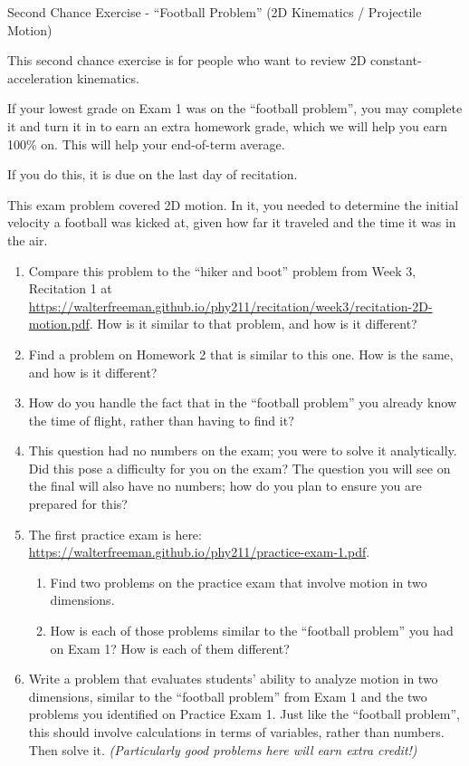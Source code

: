 \documentclass[12pt]{article}
\begin{document}
\begin{center}
\Large
\sc Second Chance Exercise - ``Football Problem'' (2D Kinematics / Projectile Motion)\rm





\normalsize
This second chance exercise is for people who want to review 2D constant-acceleration kinematics. 

If your lowest grade on Exam 1 was on the ``football problem'', you may complete it and turn it in to earn an extra homework grade, which we will help you earn 100\% on. This will help your end-of-term average.

If you do this, it is due on the last day of recitation.

\end{center}

\vspace{1.5in}

This exam problem covered 2D motion. In it, you needed to determine the initial velocity a football was kicked at, given how far it traveled and the time it was in the air.

\begin{enumerate}
	\item Compare this problem to the ``hiker and boot'' problem from Week 3, Recitation 1 at \url{https://walterfreeman.github.io/phy211/recitation/week3/recitation-2D-motion.pdf}. How is it similar to that problem, and how is it different?
	
	\item Find a problem on Homework 2 that is similar to this one. How is the same, and how is it different?
	
	\item How do you handle the fact that in the ``football problem'' you already know the time of flight, rather than having to find it?
	
	\item This question had no numbers on the exam; you were to solve it analytically. Did this pose a difficulty for you on the exam? The question you will see on the final will also have no numbers; how do you plan to ensure you are prepared for this?
	
	\item The first practice exam is here: \url{https://walterfreeman.github.io/phy211/practice-exam-1.pdf}. 
	\begin{enumerate}
		\item Find two problems on the practice exam that involve motion in two dimensions.
		\item How is each of those problems similar to the ``football problem'' you had on Exam 1? How is each of them different?
	\end{enumerate}
    \item Write a problem that evaluates students' ability to analyze motion in two dimensions, similar to the ``football problem'' from Exam 1 and the two problems you identified on Practice Exam 1. Just like the ``football problem'', this should involve calculations in terms of variables, rather than numbers. Then solve it. {\it (Particularly good problems here will earn extra credit!)}
\end{enumerate}
\end{document}

